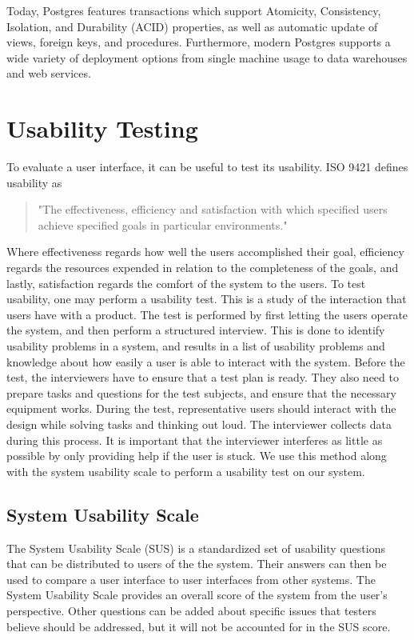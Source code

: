 Today, Postgres features transactions which support Atomicity, Consistency, Isolation, and Durability (ACID) properties, as well as automatic update of views, foreign keys, and procedures.
Furthermore, modern Postgres supports a wide variety of deployment options from single machine usage to data warehouses and web services\cite{Postgres_Docs}.

\section*{Usability Testing}
To evaluate a user interface, it can be useful to test its usability. ISO 9421 defines usability as
\begin{quote}
	"The effectiveness, efficiency and satisfaction with which specified users achieve specified goals in particular environments."
\end{quote}

Where effectiveness regards how well the users accomplished their goal, efficiency regards the resources expended in relation to the completeness of the goals, and lastly, satisfaction regards the comfort of the system to the users.
To test usability, one may perform a usability test. This is a study of the interaction that users have with a product. The test is performed by first letting the users operate the system, and then perform a structured interview. This is done to identify usability problems in a system, and results in a list of usability problems and knowledge about how easily a user is able to interact with the system.
Before the test, the interviewers have to ensure that a test plan is ready.
They also need to prepare tasks and questions for the test subjects, and ensure that the necessary equipment works.
During the test, representative users should interact with the design while solving tasks and thinking out loud. The interviewer collects data during this process. It is important that the interviewer interferes as little as possible by only providing help if the user is stuck.
\cite{deb7} We use this method along with the system usability scale to perform a usability test on our system.

\subsection*{System Usability Scale} \label{SUSScore}
The System Usability Scale (SUS) is a standardized set of usability questions that can be distributed to users of the the system. 
Their answers can then be used to compare a user interface to user interfaces from other systems.
The System Usability Scale provides an overall score of the system from the user's perspective.
Other questions can be added about specific issues that testers believe should be addressed, but it will not be accounted for in the SUS score.\cite{adobeSUS}

